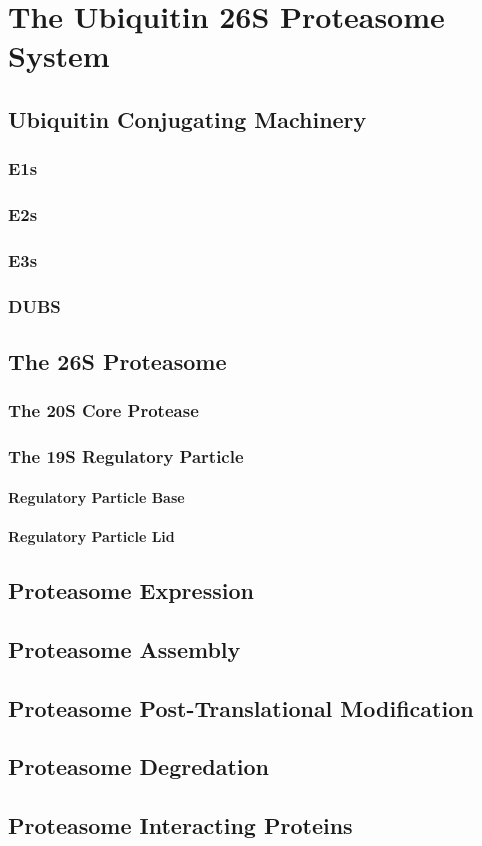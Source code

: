 \chapter{The Ubiquitin 26S Proteasome System}
\section{Ubiquitin Conjugating Machinery}
	\blindtext
	\subsection{E1s}
	\blindtext
	\subsection{E2s}
	\blindtext
	\subsection{E3s}
	\blindtext
	\subsection{DUBS}
\section{The 26S Proteasome}
	\blindtext
	\subsection{The 20S Core Protease}
	\blindtext
	\subsection{The 19S Regulatory Particle}
	\blindtext
		\subsubsection{Regulatory Particle Base}
		\blindtext
		\subsubsection{Regulatory Particle Lid}
		\blindtext
\section{Proteasome Expression}
\blindtext
\section{Proteasome Assembly}
\blindtext
\section{Proteasome Post-Translational Modification}
\blindtext
\section{Proteasome Degredation}
\blindtext
\section{Proteasome Interacting Proteins}
\blindtext